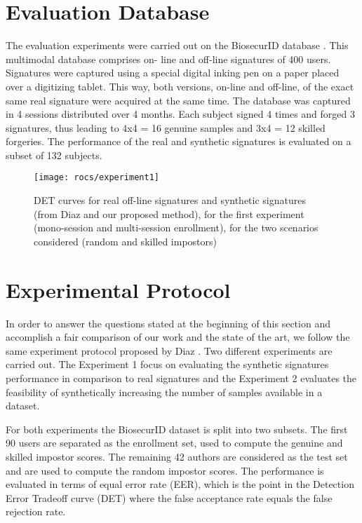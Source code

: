 \section{Evaluation Database}


The evaluation experiments were carried out on the BiosecurID
database \cite{biosecurid}. This multimodal database comprises on-
line and off-line signatures of 400 users. Signatures were
captured using a special digital inking pen on a paper placed
over a digitizing tablet. This way, both versions, on-line and
off-line, of the exact same real signature were acquired at
the same time. The database was captured in 4 sessions
distributed over 4 months. Each subject signed 4 times and
forged 3 signatures, thus leading to 4x4 = 16 genuine
samples and 3x4 = 12 skilled forgeries. The performance
of the real and synthetic signatures is evaluated on a subset
of 132 subjects.
\begin{figure*}[!htb]
	\centering
	\texttt{[image: rocs/experiment1]}
	\caption{DET curves for real off-line signatures and synthetic signatures (from Diaz and our proposed method), for the first experiment (mono-session and multi-session enrollment), for the two scenarios considered (random and skilled impostors)}
	\label{exp1}
\end{figure*}
\section{Experimental Protocol}
In order to answer the questions stated at the beginning of this section and accomplish a fair comparison of our work and the state of the art, we follow the same experiment protocol proposed by Diaz \cite{diaz2014generation}. Two different experiments are carried out. The Experiment 1 focus on evaluating the synthetic signatures performance in comparison to real signatures and the Experiment 2 evaluates the feasibility of synthetically increasing the number of samples available in a dataset. 

For both experiments the BiosecurID dataset is split into two subsets. The first 90 users are separated as the enrollment set, used to compute the genuine and skilled impostor scores. The remaining 42 authors are considered as the test set and are used to compute the random impostor scores. The performance is evaluated in terms of equal error rate (EER), which is the point in the Detection Error Tradeoff curve (DET) where the false acceptance rate equals the false rejection rate.

